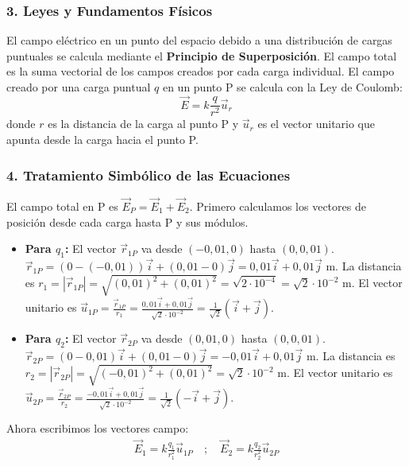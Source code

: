 \subsubsection*{3. Leyes y Fundamentos Físicos}
El campo eléctrico en un punto del espacio debido a una distribución de cargas puntuales se calcula mediante el \textbf{Principio de Superposición}. El campo total es la suma vectorial de los campos creados por cada carga individual. El campo creado por una carga puntual $q$ en un punto P se calcula con la Ley de Coulomb:
$$ \vec{E} = k \frac{q}{r^2} \vec{u}_r $$
donde $r$ es la distancia de la carga al punto P y $\vec{u}_r$ es el vector unitario que apunta desde la carga hacia el punto P.

\subsubsection*{4. Tratamiento Simbólico de las Ecuaciones}
El campo total en P es $\vec{E}_P = \vec{E}_1 + \vec{E}_2$.
Primero calculamos los vectores de posición desde cada carga hasta P y sus módulos.
\begin{itemize}
    \item \textbf{Para $q_1$:} El vector $\vec{r}_{1P}$ va desde $(-0,01, 0)$ hasta $(0, 0,01)$.
    $\vec{r}_{1P} = (0 - (-0,01))\vec{i} + (0,01 - 0)\vec{j} = 0,01\vec{i} + 0,01\vec{j}$ m.
    La distancia es $r_1 = |\vec{r}_{1P}| = \sqrt{(0,01)^2 + (0,01)^2} = \sqrt{2 \cdot 10^{-4}} = \sqrt{2} \cdot 10^{-2}$ m.
    El vector unitario es $\vec{u}_{1P} = \frac{\vec{r}_{1P}}{r_1} = \frac{0,01\vec{i} + 0,01\vec{j}}{\sqrt{2} \cdot 10^{-2}} = \frac{1}{\sqrt{2}}(\vec{i} + \vec{j})$.
    \item \textbf{Para $q_2$:} El vector $\vec{r}_{2P}$ va desde $(0,01, 0)$ hasta $(0, 0,01)$.
    $\vec{r}_{2P} = (0 - 0,01)\vec{i} + (0,01 - 0)\vec{j} = -0,01\vec{i} + 0,01\vec{j}$ m.
    La distancia es $r_2 = |\vec{r}_{2P}| = \sqrt{(-0,01)^2 + (0,01)^2} = \sqrt{2} \cdot 10^{-2}$ m.
    El vector unitario es $\vec{u}_{2P} = \frac{\vec{r}_{2P}}{r_2} = \frac{-0,01\vec{i} + 0,01\vec{j}}{\sqrt{2} \cdot 10^{-2}} = \frac{1}{\sqrt{2}}(-\vec{i} + \vec{j})$.
\end{itemize}
Ahora escribimos los vectores campo:
\begin{gather}
    \vec{E}_1 = k \frac{q_1}{r_1^2} \vec{u}_{1P} \quad ; \quad \vec{E}_2 = k \frac{q_2}{r_2^2} \vec{u}_{2P}
\end{gather}

